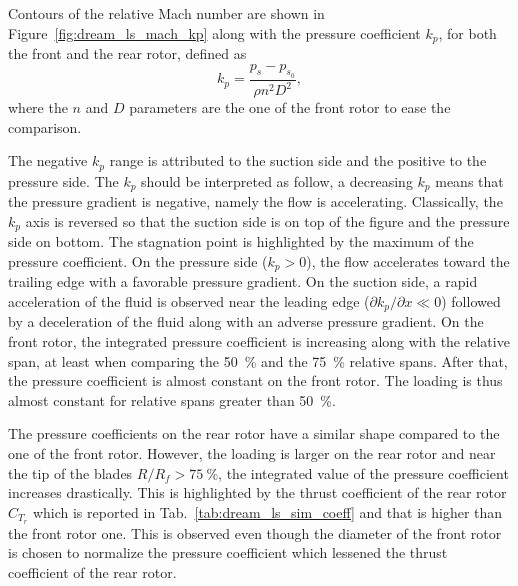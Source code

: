 Contours of the relative Mach number are shown in 
Figure~\ref{fig:dream_ls_mach_kp} along with the pressure coefficient $k_p$,
for both the front and the rear rotor, defined as
\begin{equation}
   k_p = \frac{p_s - p_{s_0}}{\rho n^2 D^2},
\end{equation}
where the $n$ and $D$ parameters are the one of the front rotor
to ease the comparison.

The negative $k_p$ range is attributed
to the suction side and the positive to the pressure side.
The $k_p$ should be interpreted as follow, a decreasing $k_p$
means that the pressure gradient is negative, namely the flow
is accelerating.
Classically, the $k_p$ axis is reversed so that the suction side
is on top of the figure and the pressure side on bottom.
The stagnation point is highlighted
by the maximum of the pressure coefficient. On the pressure side 
($k_p > 0$), the flow accelerates
toward the trailing edge with a favorable pressure gradient. 
On the suction side, a rapid acceleration of the fluid
is observed near the leading edge 
($\partial k_p / \partial x \ll 0$) followed by
a deceleration of the fluid along with an
adverse pressure gradient.
On the front rotor, the integrated pressure coefficient is
increasing along with the relative span, at least 
when comparing the 50~\% and the 75~\% relative spans.
After that, the pressure coefficient is almost constant on 
the front rotor. The loading is thus almost constant for
relative spans greater than 50~\%. 

The pressure coefficients on the rear rotor have a similar shape
compared to the one of the front rotor. However, the loading is
larger on the rear rotor and near the tip of the blades
$R/R_f > 75~\%$, the integrated value of the pressure coefficient
increases drastically. This is highlighted by the thrust coefficient 
of the rear rotor $C_{T_r}$ which is reported in 
Tab.~\ref{tab:dream_ls_sim_coeff} and that is higher than
the front rotor one. This is observed even though the diameter of the front
rotor is chosen to normalize the pressure coefficient which
lessened the thrust coefficient of the rear rotor.

